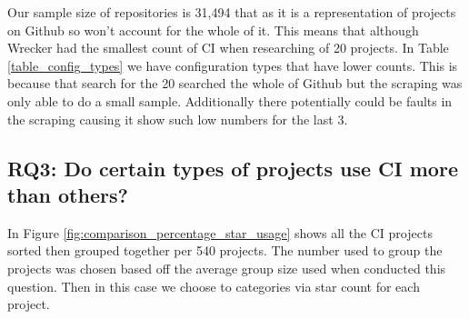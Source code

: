 \documentclass[10pt,conference]{IEEEtran}
\begin{document}
Our sample size of repositories is 31,494 that as it is a representation of projects on Github so won't account for the whole of it. This means that although Wrecker had the smallest count of CI when researching of 20 projects. In Table \ref{table_config_types} we have configuration types that have lower counts. This is because that search for the 20 searched the whole of Github but the scraping was only able to do a small sample. Additionally there potentially could be faults in the scraping causing it show such low numbers for the last 3. 

\vspace*{-0.05in}
\subsection{\textbf{RQ3}: Do certain types of projects use CI more than others?}  
\label{section:RQ3}
\vspace*{-0.05in}

In Figure \ref{fig:comparison_percentage_star_usage} shows all the CI projects sorted then grouped together per 540 projects. The number used to group the projects was chosen based off the average group size used when \citet{Hilton2016} conducted this question. Then in this case we choose to categories via star count for each project. 
\end{document}
